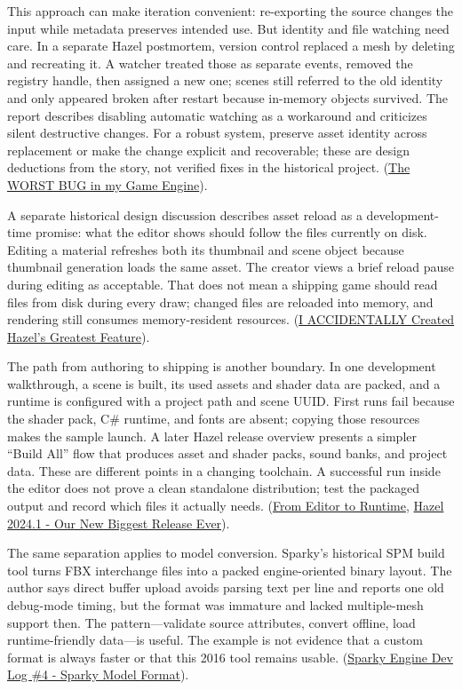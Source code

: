 This approach can make iteration convenient: re-exporting the source changes the input while metadata preserves intended use. But identity and file watching need care. In a separate Hazel postmortem, version control replaced a mesh by deleting and recreating it. A watcher treated those as separate events, removed the registry handle, then assigned a new one; scenes still referred to the old identity and only appeared broken after restart because in-memory objects survived. The report describes disabling automatic watching as a workaround and criticizes silent destructive changes. For a robust system, preserve asset identity across replacement or make the change explicit and recoverable; these are design deductions from the story, not verified fixes in the historical project. (\href{https://www.youtube.com/watch?v=x5dy8T9dRPk&t=0m3s}{The WORST BUG in my Game Engine}).

A separate historical design discussion describes asset reload as a development-time promise: what the editor shows should follow the files currently on disk. Editing a material refreshes both its thumbnail and scene object because thumbnail generation loads the same asset. The creator views a brief reload pause during editing as acceptable. That does not mean a shipping game should read files from disk during every draw; changed files are reloaded into memory, and rendering still consumes memory-resident resources. (\href{https://www.youtube.com/watch?v=yMRp9DVZYnI&t=13m14s}{I ACCIDENTALLY Created Hazel's Greatest Feature}).

The path from authoring to shipping is another boundary. In one development walkthrough, a scene is built, its used assets and shader data are packed, and a runtime is configured with a project path and scene UUID. First runs fail because the shader pack, C\# runtime, and fonts are absent; copying those resources makes the sample launch. A later Hazel release overview presents a simpler ``Build All'' flow that produces asset and shader packs, sound banks, and project data. These are different points in a changing toolchain. A successful run inside the editor does not prove a clean standalone distribution; test the packaged output and record which files it actually needs. (\href{https://www.youtube.com/watch?v=Z2U-S3fxAg8&t=18m4s}{From Editor to Runtime}, \href{https://www.youtube.com/watch?v=10OVd1VHEZ4&t=9m45s}{Hazel 2024.1 - Our New Biggest Release Ever}).

The same separation applies to model conversion. Sparky's historical SPM build tool turns FBX interchange files into a packed engine-oriented binary layout. The author says direct buffer upload avoids parsing text per line and reports one old debug-mode timing, but the format was immature and lacked multiple-mesh support then. The pattern---validate source attributes, convert offline, load runtime-friendly data---is useful. The example is not evidence that a custom format is always faster or that this 2016 tool remains usable. (\href{https://www.youtube.com/watch?v=EUy8G3uMitI&t=3m47s}{Sparky Engine Dev Log \#4 - Sparky Model Format}).

